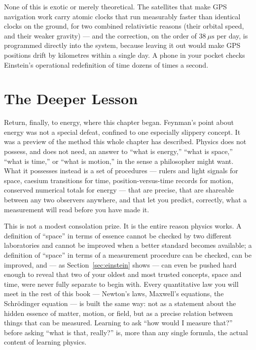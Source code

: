 \documentclass[12pt]{book}
\begin{document}
None of this is exotic or merely theoretical. The satellites that make GPS navigation work carry atomic clocks that run measurably faster than identical clocks on the ground, for two combined relativistic reasons (their orbital speed, and their weaker gravity) --- and the correction, on the order of $38\ \mu\text{s}$ per day, is programmed directly into the system, because leaving it out would make GPS positions drift by kilometres within a single day. A phone in your pocket checks Einstein's operational redefinition of time dozens of times a second.

\section{The Deeper Lesson}
\label{sec:lesson}

Return, finally, to energy, where this chapter began. Feynman's point about energy was not a special defeat, confined to one especially slippery concept. It was a preview of the method this whole chapter has described. Physics does not possess, and does not need, an answer to ``what is energy,'' ``what is space,'' ``what is time,'' or ``what is motion,'' in the sense a philosopher might want. What it possesses instead is a set of procedures --- rulers and light signals for space, caesium transitions for time, position-versus-time records for motion, conserved numerical totals for energy --- that are precise, that are shareable between any two observers anywhere, and that let you predict, correctly, what a measurement will read before you have made it.

This is not a modest consolation prize. It is the entire reason physics works. A definition of ``space'' in terms of essence cannot be checked by two different laboratories and cannot be improved when a better standard becomes available; a definition of ``space'' in terms of a measurement procedure can be checked, can be improved, and --- as Section~\ref{sec:einstein} shows --- can even be pushed hard enough to reveal that two of your oldest and most trusted concepts, space and time, were never fully separate to begin with. Every quantitative law you will meet in the rest of this book --- Newton's laws, Maxwell's equations, the Schr\"odinger equation --- is built the same way: not as a statement about the hidden essence of matter, motion, or field, but as a precise relation between things that can be measured. Learning to ask ``how would I measure that?'' before asking ``what is that, really?'' is, more than any single formula, the actual content of learning physics.
\end{document}
